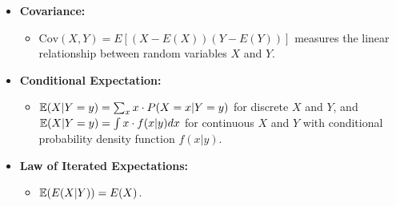 \documentclass{article}
\begin{document}
\begin{itemize}
\begin{itemize}
        \item \textbf{Covariance:}
        \begin{itemize}
            \item $\text{Cov}(X, Y) = E[(X - E(X))(Y - E(Y))]$ measures the linear relationship between random variables $X$ and $Y$.
        \end{itemize}
        \item \textbf{Conditional Expectation:}
        \begin{itemize}
            \item ${\mathbb E}(X|Y=y) = \sum_{x} x \cdot P(X = x|Y = y)$ for discrete $X$ and $Y$, and ${\mathbb E}(X|Y=y) = \int x \cdot f(x|y) dx$ for continuous $X$ and $Y$ with conditional probability density function $f(x|y)$.
        \end{itemize}        
        \item \textbf{Law of Iterated Expectations:} 
        \begin{itemize}
            \item ${\mathbb E}(E(X|Y)) = E(X)$.
        \end{itemize}

    
    \end{itemize}
    

\end{itemize}

 
 
\end{document}
